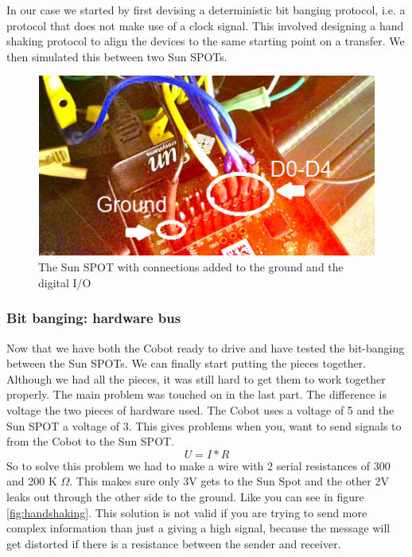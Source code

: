 \documentclass[a4paper,10pt]{article} %
\begin{document}
In our case we started by first devising a deterministic bit banging protocol,
i.e. a protocol that does not make use of a clock signal. This involved
designing a hand shaking protocol to align the devices to the same starting
point on a transfer. We then simulated this between two Sun SPOTs.

\begin{figure}[H]
\label{fig:sunspotconnections}
\centering
\includegraphics{img/sunspotconnections1.png}
\caption{The Sun SPOT with connections added to the ground and the digital
I/O}
\end{figure}


\subsubsection{Bit banging: hardware bus} %

Now that we have both the Cobot ready to drive and have tested the bit-banging between the
Sun SPOTs. We can finally start putting the pieces together. Although we had all
the pieces, it was still hard to get them to work together properly.  The main
problem was touched on in the last part. The difference is voltage the two
pieces of hardware used. The Cobot uses a voltage of 5 and the Sun SPOT a
voltage of 3. This gives problems when you, want to send signals to from the
Cobot to the Sun SPOT.  \begin{equation} \label{eq:voltage} U = I*R
\end{equation}
So to solve this problem we had to make a wire with 2 serial resistances of 300
and 200 K $\Omega$. This makes sure only 3V gets to the Sun Spot and the
other 2V leaks out through the other side to the ground. Like you can see in
figure \ref{fig:handshaking}.
This solution is not valid if you are trying to send more complex information
than just a giving a high signal, because the message will get distorted if
there is a resistance between the sender and receiver.
\end{document}
